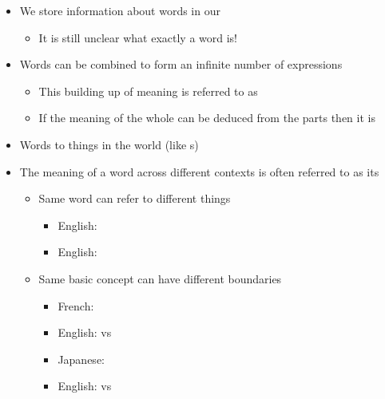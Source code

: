 \documentclass[a4paper,landscape,headrule,footrule,xetex,25pt]{foils}
\begin{document}
\begin{itemize}
\item We store information about words in our 
  \begin{itemize}
  \item It is still unclear what exactly a word is!
  \end{itemize}
\item Words can be combined to form an infinite number of expressions
  \begin{itemize}
  \item This building up of meaning is referred to as 
  \item If the meaning of the whole can be deduced from the parts then it is 
  \end{itemize}
\end{itemize}


\begin{itemize}
\item Words  to things in the world (like s)
\item The meaning of a word across different contexts is often referred to as its 
  \begin{itemize}
  \item Same word can refer to different things
    \begin{itemize}
    \item English: 
    \item English: 
    \end{itemize}
  \item Same basic concept can have different boundaries
    \begin{itemize}
    \item French: 
    \item English:  vs 
      
    \item Japanese: 
    \item English:  vs 
    \end{itemize}
  \end{itemize}
\end{itemize}
\end{document}
